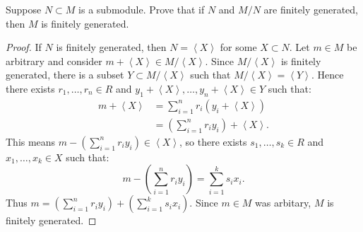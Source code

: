 \documentclass[10pt,oneside,openany]{memoir}
\begin{document}
\begin{exercise}
	Suppose $N\subset M$ is a submodule. Prove that if $N$ and $M/N$ are finitely generated, then $M$ is finitely generated.
\end{exercise}
{\color{blue}

	\begin{proof}
		If $N$ is finitely generated, then $N = \left<X \right>$ for some $X \subset N$. Let $m \in M$ be arbitrary and consider $m +\left<X \right> \in M / \left<X \right>$. Since $M / \left<X \right>$ is finitely generated, there is a subset $Y \subset M/\left<X \right>$ such that $M/\left<X \right> = \left<Y \right>$. Hence there exists $r_1,\ldots ,r_n \in R$ and $y_1+\left<X \right>,\ldots ,y_n+\left<X \right> \in Y$ such that:
		\begin{align*}
			m + \left<X \right>
			&= \sum_{i=1}^{n} r_i (y_i + \left<X \right>) \\
			&= \left(\sum_{i=1}^{n} r_i y_i \right) + \left<X \right>.
		\end{align*}
		This means $m - \left( \sum_{i=1}^{n} r_i y_i \right) \in \left<X \right>$, so there exists $s_1,\ldots ,s_k \in R$ and $x_1,\ldots ,x_k \in X$ such that:
		\[
			m - \left( \sum_{i=1}^{n} r_i y_i \right) = \sum_{i=1}^{k} s_i x_i.
		\] 
		Thus $m = \left( \sum_{i=1}^{n} r_i y_i \right) + \left( \sum_{i=1}^{k} s_i x_i \right)$. Since $m \in M$ was arbitary, $M$ is finitely generated.
	\end{proof}
}
\end{document}
